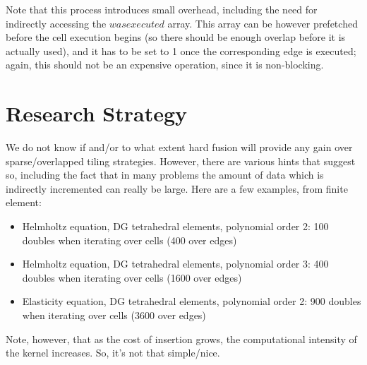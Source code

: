 \documentclass[a4paper]{article}
\begin{document}
Note that this process introduces small overhead, including the need for indirectly accessing the $wasexecuted$ array. This array can be however prefetched before the cell execution begins (so there should be enough overlap before it is actually used), and it has to be set to 1 once the corresponding edge is executed; again, this should not be an expensive operation, since it is non-blocking.

\section{Research Strategy}
We do not know if and/or to what extent hard fusion will provide any gain over sparse/overlapped tiling strategies. However, there are various hints that suggest so, including the fact that in many problems the amount of data which is indirectly incremented can really be large. Here are a few examples, from finite element:
\begin{itemize}
\item Helmholtz equation, DG tetrahedral elements, polynomial order 2: 100 doubles when iterating over cells (400 over edges)
\item Helmholtz equation, DG tetrahedral elements, polynomial order 3: 400 doubles when iterating over cells (1600 over edges)
\item Elasticity equation, DG tetrahedral elements, polynomial order 2: 900 doubles when iterating over cells (3600 over edges)
\end{itemize}
Note, however, that as the cost of insertion grows, the computational intensity of the kernel increases. So, it's not that simple/nice.
\end{document}
